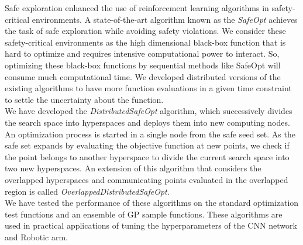 \hspace*{0.7cm}Safe exploration enhanced the use of reinforcement learning algorithms in safety-critical environments. 
A state-of-the-art algorithm known as the \emph{SafeOpt} achieves the task of safe exploration while avoiding safety violations. 
We consider these safety-critical environments as the high dimensional black-box function that is hard to optimize and requires intensive computational power to interact. 
So, optimizing these black-box functions by sequential methods like SafeOpt will consume much computational time. 
We developed distributed versions of the existing algorithms to have more function evaluations in a given time constraint to settle the uncertainty about the function.\\

We have developed the \emph{DistributedSafeOpt} algorithm, which successively divides the search space into hyperspaces and deploys them into new computing nodes. 
An optimization process is started in a single node from the safe seed set. 
As the safe set expands by evaluating the objective function at new points, we check if the point belongs to another hyperspace to divide the current search space into two new hyperspaces. 
An extension of this algorithm that considers the overlapped hyperspaces and communicating points evaluated in the overlapped region is called \emph{OverlappedDistributedSafeOpt}.\\

We have tested the performance of these algorithms on the standard optimization test functions and an ensemble of GP sample functions. 
These algorithms are used in practical applications of tuning the hyperparameters of the CNN network and Robotic arm.
